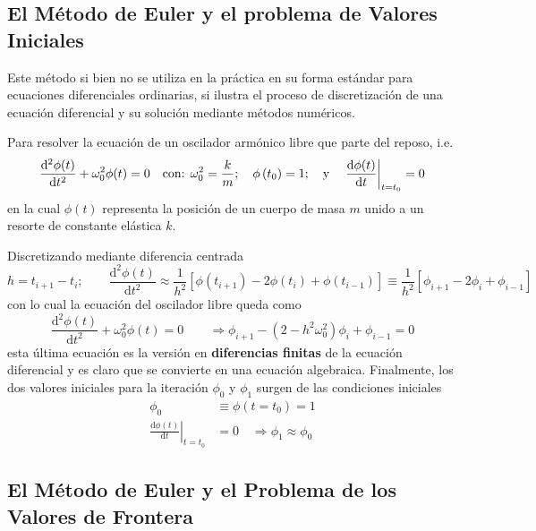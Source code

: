 \documentclass[spanish,titlepage,11pt]{article}
\begin{document}
\subsection{El M\'{e}todo de Euler y el problema de Valores Iniciales}

Este m\'{e}todo si bien no se utiliza en la pr\'{a}ctica en su forma
est\'{a}ndar para ecuaciones diferenciales ordinarias, si ilustra el proceso
de discretizaci\'{o}n de una ecuaci\'{o}n diferencial y su soluci\'{o}n
mediante m\'{e}todos num\'{e}ricos.

Para resolver la ecuaci\'{o}n de un oscilador arm\'{o}nico libre que parte del
reposo, i.e.
\[
\frac{\mathrm{d}^{2}\phi(t)}{\mathrm{d}t^{2}}+\omega_{0}^{2}\phi
(t)=0\quad\text{con: }\omega_{0}^{2}=\frac{k}{m};\quad\phi\left(
t_{0}\right)  =1;\quad\text{y\quad}\left.  \frac{\mathrm{d}\phi(t)}%
{\mathrm{d}t}\right|  _{t=t_{0}}=0
\]
en la cual $\phi(t)$ representa la posici\'{o}n de un cuerpo de masa $m$ unido
a un resorte de constante el\'{a}stica $k.$

Discretizando mediante diferencia centrada
\[
h=t_{i+1}-t_{i};\qquad\frac{\mathrm{d}^{2}\phi(t)}{\mathrm{d}t^{2}}%
\approx\frac{1}{h^{2}}\left[  \phi(t_{i+1})-2\phi(t_{i})+\phi(t_{i-1})\right]
\equiv\frac{1}{h^{2}}\left[  \phi_{i+1}-2\phi_{i}+\phi_{i-1}\right]
\]
con lo cual la ecuaci\'{o}n del oscilador libre queda como
\[
\frac{\mathrm{d}^{2}\phi(t)}{\mathrm{d}t^{2}}+\omega_{0}^{2}\phi
(t)=0\qquad\Rightarrow\phi_{i+1}-\left(  2-h^{2}\omega_{0}^{2}\right)
\phi_{i}+\phi_{i-1}=0
\]
esta \'{u}ltima ecuaci\'{o}n es la versi\'{o}n en \textbf{diferencias finitas}
de la ecuaci\'{o}n diferencial y es claro que se convierte en una ecuaci\'{o}n
algebraica. Finalmente, los dos valores iniciales para la iteraci\'{o}n
$\phi_{0}$ y $\phi_{1}$ surgen de las condiciones iniciales
\begin{align*}
\phi_{0}  &  \equiv\phi\left(  t=t_{0}\right)  =1\\
\left.  \frac{\mathrm{d}\phi(t)}{\mathrm{d}t}\right|  _{t=t_{0}}  &
=0\quad\Rightarrow\phi_{1}\approx\phi_{0}%
\end{align*}

\subsection{El M\'{e}todo de Euler y el Problema de los Valores de Frontera}
\end{document}

